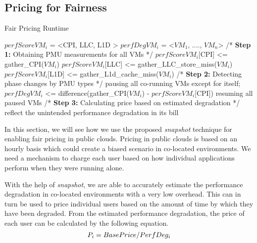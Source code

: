 \documentclass{sig-alternate}
\begin{document}
\subsection{Pricing for Fairness}
\label{subsec:PricingforFairness}
\begin{algorithm}[!t]
\caption{Fair Pricing Runtime }
\label{alg:fpalgo}
\begin{algorithmic}
\begin{small}
\State $perfScoreVM_{i}$ = <CPI, LLC, L1D >\;
\State $perfDegVM_{i}$ = <$VM_{1}$, ...., $VM_{n}$> 
\State
\State /* \textbf{Step 1:} Obtaining PMU measurements for all VMs */
\State $perfScoreVM_{i}$[CPI] <= gather\_CPI($VM_{i}$) 
\State $perfScoreVM_{i}$[LLC] <= gather\_LLC\_store\_miss($VM_{i}$)
\State $perfScoreVM_{i}$[L1D] <= gather\_L1d\_cache\_miss($VM_{i}$)
\EndFor 
\State
\State /* \textbf{Step 2:} Detecting phase changes by PMU types */
\State pausing all co-running VMs except for itself;
\State $perfDegVM_{i}$ <= difference(gather\_CPI($VM_{i}$) - $perfScoreVM_{i}$[CPI])
\State resuming all paused VMs
\EndIf
\EndFor 
\EndFor 
\State
\State /* \textbf{Step 3:} Calculating price based on estimated degradation */
\State reflect the unintended performance degradation in its bill
\EndIf
\EndFor 
\end{small}
\end{algorithmic}
\end{algorithm}

In this section, we will see how we use the proposed \textit{snapshot} technique for enabling fair pricing in public clouds. Pricing in public clouds is based on an hourly basis which could create a biased scenario in co-located environments. We need a mechanism to charge each user based on how individual applications perform when they were running alone. 

With the help of \textit{snapshot}, we are able to accurately estimate the performance degradation in co-located environments with a very low overhead. This can in turn be used to price individual users based on the amount of time by which they have been degraded. From the estimated performance degradation, the price of each user can be calculated by the following equation. 
\vspace{-0.05in}
\begin{equation} \label{price}
P_{i} = BasePrice/PerfDeg_{i}
\vspace{-0.05in}
\end{equation}
\end{document}
